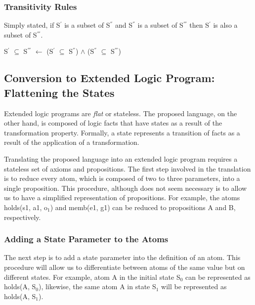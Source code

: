 \documentclass[a4paper]{article}
\begin{document}
      \subsubsection{Transitivity Rules}

        Simply stated, if S$^{'}$ is a subset of S$^{''}$ and S$^{''}$ is a
        subset of S$^{'''}$ then S$^{'}$ is also a subset of S$^{'''}$.

        \begin{list}{}{}
          \item
            S$^{'}$ $\subseteq$ S$^{'''}$ $\leftarrow$
            (S$^{'}$ $\subseteq$ S$^{''}$) $\land$ 
            (S$^{''}$ $\subseteq$ S$^{'''}$)
        \end{list}

    \subsection{Conversion to Extended Logic Program: Flattening the States}

      Extended logic programs are \emph{flat} or stateless. The proposed
      language, on the other hand, is composed of logic facts that have
      states as a result of the transformation property. Formally, a state
      represents a transition of facts as a result of the application of a
      transformation. 

      Translating the proposed language into an extended logic program requires
      a stateless set of axioms and propositions. The first step involved in
      the translation is to reduce every atom, which is composed of two to
      three parameters, into a single proposition. This procedure, although
      does not seem necessary is to allow us to have a simplified
      representation of propositions. For example, the atoms holds(s1, a1, 
      o$_{1}$) and memb(e1, g1) can be reduced to propositions A and B,
      respectively.

      \subsubsection{Adding a State Parameter to the Atoms}

        The next step is to add a state parameter into the definition of an
        atom. This procedure will allow us to differentiate between atoms of
        the same value but on different states. For example, atom A in 
        the initial state S$_0$ can be represented as holds(A, S$_0$),
        likewise, the same atom A in state S$_1$ will be represented as
        holds(A, S$_1$).
\end{document}
